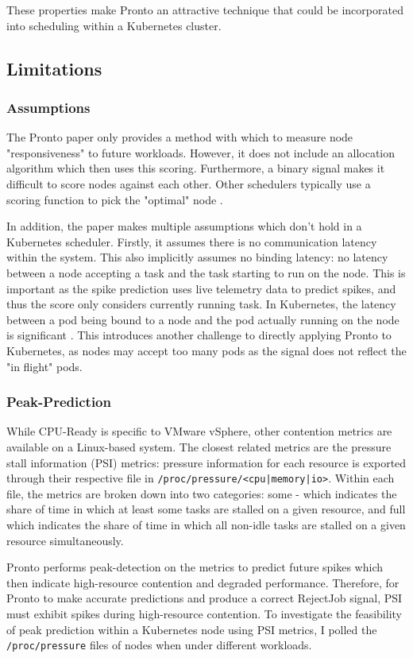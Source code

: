 These properties make Pronto an attractive technique that could be incorporated
into scheduling within a Kubernetes cluster.

\subsection{Limitations}

\subsubsection{Assumptions}
The Pronto paper only provides a method with which to measure node
"responsiveness" to future workloads. However, it does not include an allocation
algorithm which then uses this scoring. Furthermore, a binary signal makes it
difficult to score nodes against each other. Other schedulers typically use a
scoring function to pick the "optimal" node \cite{}.

In addition, the paper makes multiple assumptions which don't hold in a Kubernetes
scheduler. Firstly, it assumes there is no communication latency within the system.
This also implicitly assumes no binding latency: no latency between a node
accepting a task and the task starting to run on the node. This is important as
the spike prediction uses live telemetry data to predict spikes, and thus the
score only considers currently running task. In Kubernetes, the latency between
a pod being bound to a node and the pod actually running on the node is
significant \cite{}. This introduces another challenge to directly applying
Pronto to Kubernetes, as nodes may accept too many pods as the signal does not
reflect the "in flight" pods.

\subsubsection{Peak-Prediction}
While CPU-Ready is specific to VMware vSphere, other contention metrics
are available on a Linux-based system. The closest related metrics are the
pressure stall information (PSI) metrics: pressure information for each resource
is exported through their respective file in
\verb$/proc/pressure/<cpu|memory|io>$. Within each file, the metrics are
broken down into two categories: some - which indicates the share of time in
which at least some tasks are stalled on a given resource, and full which
indicates the share of time in which all non-idle tasks are stalled on a given
resource simultaneously.


Pronto performs peak-detection on the metrics to predict future spikes which
then indicate high-resource contention and degraded performance. Therefore, for
Pronto to make accurate predictions and produce a correct RejectJob signal, PSI
must exhibit spikes during high-resource contention. To investigate the
feasibility of peak prediction within a Kubernetes node using PSI metrics, I
polled the \verb|/proc/pressure| files of nodes when under different workloads.


